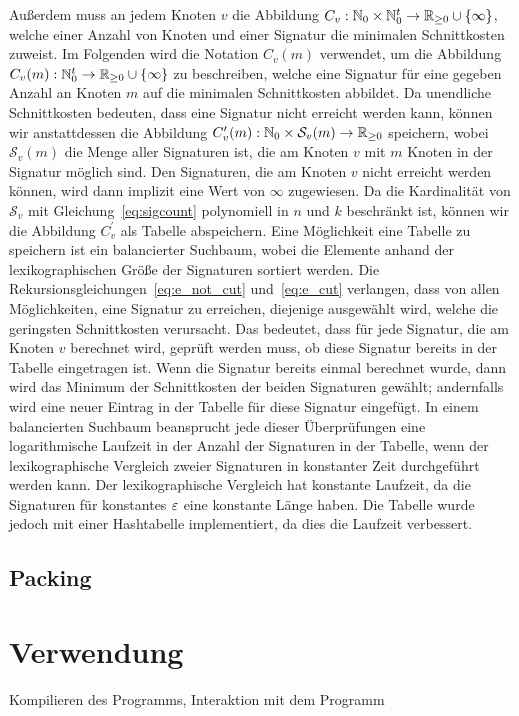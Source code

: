 Außerdem muss an jedem Knoten $v$ die Abbildung $C_v : \mathbb{N}_0 \times \mathbb{N}^t_0 \rightarrow \mathbb{R}_{\geq 0} \cup \{\infty\}$, welche einer Anzahl von Knoten und einer Signatur die minimalen Schnittkosten zuweist.
Im Folgenden wird die Notation $C_v(m)$ verwendet, um die Abbildung $C_v(m) : \mathbb{N}^t_0 \rightarrow \mathbb{R}_{\geq 0} \cup \{\infty\}$ zu beschreiben, welche eine Signatur für eine gegeben Anzahl an Knoten $m$ auf die minimalen Schnittkosten abbildet.
Da unendliche Schnittkosten bedeuten, dass eine Signatur nicht erreicht werden kann, können wir anstattdessen die Abbildung $C_v^\prime(m) : \mathbb{N}_0 \times \mathcal{S}_v(m) \rightarrow \mathbb{R}_{\geq 0}$ speichern, wobei $\mathcal{S}_v(m)$ die Menge aller Signaturen ist, die am Knoten $v$ mit $m$ Knoten in der Signatur möglich sind.
Den Signaturen, die am Knoten $v$ nicht erreicht werden können, wird dann implizit eine Wert von $\infty$ zugewiesen.
Da die Kardinalität von $\mathcal{S}_v$ mit Gleichung~\eqref{eq:sigcount} polynomiell in $n$ und $k$ beschränkt ist, können wir die Abbildung $C_v^\prime$ als Tabelle abspeichern.
Eine Möglichkeit eine Tabelle zu speichern ist ein balancierter Suchbaum, wobei die Elemente anhand der lexikographischen Größe der Signaturen sortiert werden.
Die Rekursionsgleichungen~\eqref{eq:e_not_cut} und~\eqref{eq:e_cut} verlangen, dass von allen Möglichkeiten, eine Signatur zu erreichen, diejenige ausgewählt wird, welche die geringsten Schnittkosten verursacht.
Das bedeutet, dass für jede Signatur, die am Knoten $v$ berechnet wird, geprüft werden muss, ob diese Signatur bereits in der Tabelle eingetragen ist.
Wenn die Signatur bereits einmal berechnet wurde, dann wird das Minimum der Schnittkosten der beiden Signaturen gewählt; andernfalls wird eine neuer Eintrag in der Tabelle für diese Signatur eingefügt.
In einem balancierten Suchbaum beansprucht jede dieser Überprüfungen eine logarithmische Laufzeit in der Anzahl der Signaturen in der Tabelle, wenn der lexikographische Vergleich zweier Signaturen in konstanter Zeit durchgeführt werden kann.
Der lexikographische Vergleich hat konstante Laufzeit, da die Signaturen für konstantes $\varepsilon$ eine konstante Länge haben.
Die Tabelle wurde jedoch mit einer Hashtabelle implementiert, da dies die Laufzeit verbessert.

\subsection{Packing}

\section{Verwendung}
Kompilieren des Programms, Interaktion mit dem Programm
